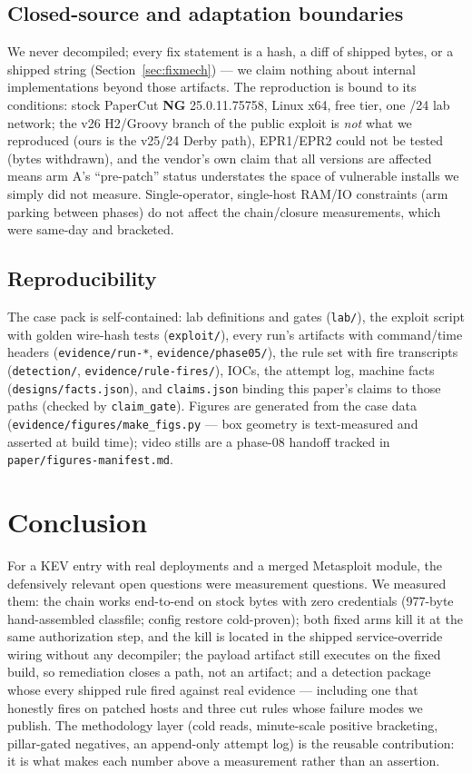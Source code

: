 \documentclass[journal]{IEEEtran}
\begin{document}
\subsection{Closed-source and adaptation boundaries}
We never decompiled; every fix statement is a hash, a diff of shipped bytes, or
a shipped string (Section~\ref{sec:fixmech}) — we claim nothing about internal
implementations beyond those artifacts. The reproduction is bound to its
conditions: stock PaperCut \textbf{NG} 25.0.11.75758, Linux x64, free tier, one
/\hspace{0pt}24 lab network; the v26 H2/Groovy branch of the public exploit is
\emph{not} what we reproduced (ours is the v25/24 Derby path), EPR1/EPR2 could
not be tested (bytes withdrawn), and the vendor's own claim that all versions
are affected means arm A's ``pre-patch'' status understates the space of
vulnerable installs we simply did not measure. Single-operator, single-host
RAM/IO constraints (arm parking between phases) do not affect the
chain/closure measurements, which were same-day and bracketed.

\subsection{Reproducibility}
The case pack is self-contained: lab definitions and gates
(\texttt{lab/}), the exploit script with golden wire-hash tests
(\texttt{exploit/}), every run's artifacts with command/time headers
(\texttt{evidence/run-*}, \texttt{evidence/phase05/}), the rule set with fire
transcripts (\texttt{detection/}, \texttt{evidence/rule-fires/}), IOCs, the
attempt log, machine facts (\texttt{designs/facts.json}), and
\texttt{claims.json} binding this paper's claims to those paths (checked by
\texttt{claim\_gate}). Figures are generated from the case data
(\texttt{evidence/figures/make\_figs.py} — box geometry is text-measured and
asserted at build time); video stills are a phase-08 handoff tracked in
\texttt{paper/figures-manifest.md}.

\section{Conclusion}
For a KEV entry with real deployments and a merged Metasploit module, the
defensively relevant open questions were measurement questions. We measured
them: the chain works end-to-end on stock bytes with zero credentials
(977-byte hand-assembled classfile; config restore cold-proven); both fixed
arms kill it at the same authorization step, and the kill is located in the
shipped service-override wiring without any decompiler; the payload artifact
still executes on the fixed build, so remediation closes a path, not an
artifact; and a detection package whose every shipped rule fired against real
evidence — including one that honestly fires on patched hosts and three cut
rules whose failure modes we publish. The methodology layer (cold reads,
minute-scale positive bracketing, pillar-gated negatives, an append-only
attempt log) is the reusable contribution: it is what makes each number above
a measurement rather than an assertion.
\end{document}
